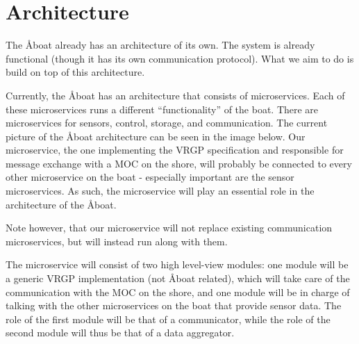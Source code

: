\section{Architecture}\label{sec:architecture}

The Åboat already has an architecture of its own. The system is already functional (though it has its own communication protocol). What we aim to do is build on top of this architecture.

Currently, the Åboat has an architecture that consists of microservices. Each of these microservices runs a different “functionality” of the boat. There are microservices for sensors, control, storage, and communication. The current picture of the Åboat architecture can be seen in the image below. Our microservice, the one implementing the VRGP specification and responsible for message exchange with a MOC on the shore, will probably be connected to every other microservice on the boat - especially important are the sensor microservices. As such, the microservice will play an essential role in the architecture of the Åboat.

Note however, that our microservice will not replace existing communication microservices, but will instead run along with them.

The microservice will consist of two high level-view modules: one module will be a generic VRGP implementation (not Åboat related), which will take care of the communication with the MOC on the shore, and one module will be in charge of talking with the other microservices on the boat that provide sensor data. The role of the first module will be that of a communicator, while the role of the second module will thus be that of a data aggregator.
